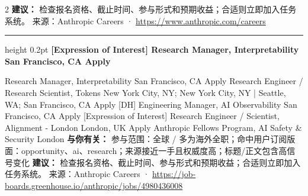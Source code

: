 \documentclass[10.5pt]{ctexart}
\begin{document}
\begin{multicols}{2}
\textbf{建议：} 检查报名资格、截止时间、参与形式和预期收益；合适则立即加入任务系统。
{\footnotesize\color{ormuted} 来源：Anthropic Careers · \url{https://www.anthropic.com/careers}}
\vspace{2mm}
\hrule height 0.2pt
\vspace{2mm}
{\large\bfseries [Expression of Interest] Research Manager, Interpretability San Francisco, CA Apply}\par
[Expression of Interest] Research Manager, Interpretability San Francisco, CA Apply Research Engineer / Research Scientist, Tokens New York City, NY; New York City, NY | Seattle, WA; San Francisco, CA Apply [DH] Engineering Manager, AI Observability San Francisco, CA Apply [Expression of Interest] Research Engineer / Scientist, Alignment - London London, UK Apply Anthropic Fellows Program, AI Safety \& Security London
\textbf{与你有关：} 参与范围：全球 / 多为海外全职；命中用户订阅版面：opportunity、ai、research；来源接近一手且权威度高；标题/正文包含高信号变化
\textbf{建议：} 检查报名资格、截止时间、参与形式和预期收益；合适则立即加入任务系统。
{\footnotesize\color{ormuted} 来源：Anthropic Careers · \url{https://job-boards.greenhouse.io/anthropic/jobs/4980436008}}
\end{multicols}
\end{document}
